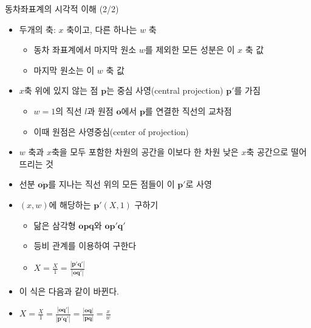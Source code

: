 \begin{frame}{동차좌표계의 시각적 이해 (2/2)}

\begin{itemize}
\item 두개의 축: $x$ 축이고, 다른 하나는 $w$ 축
	\begin{itemize}
	\item 동차 좌표계에서 마지막 원소 $w$를 제외한 모든 성분은 이 $x$ 축 값
	\item 마지막 원소는 이 $w$ 축 값
	\end{itemize}
\item $x$축 위에 있지 않는 점 $\mathbf p$는 중심 사영(central projection) $\mathbf p'$를 가짐
	\begin{itemize}
	\item $w=1$의 직선 $l$과 원점 $\mathbf o$에서 $\mathbf p$를 연결한 직선의 교차점
	\item 이때 원점은 사영중심(center of projection)
	\end{itemize}
\item $w$ 축과 $x$축을 모두 포함한 차원의 공간을 이보다 한 차원 낮은 $x$축 공간으로 떨어뜨리는 것
\item 선분 $\overline{\mathbf o \mathbf p}$를 지나는 직선 위의 모든 점들이 이 $\mathbf p'$로 사영
\item $(x,w)$에 해당하는 $\mathbf p'(X,1)$ 구하기
	\begin{itemize}
	\item 닮은 삼각형 $\mathbf{opq}$와 $\mathbf{op'q'}$
	\item 등비 관계를 이용하여 구한다
	\item $X = \frac{X}{1} = \frac{|\mathbf{p'q'}|}{|\mathbf{oq'}|}$
	\end{itemize}
\item 이 식은 다음과 같이 바뀐다.
\item $X = \frac{X}{1} = \frac{|\mathbf{oq'}|}{|\mathbf{p'q'}|} = \frac{|\mathbf{oq}|}{|\mathbf{pq}|} = \frac{x}{w} $
\end{itemize}



\end{frame}

